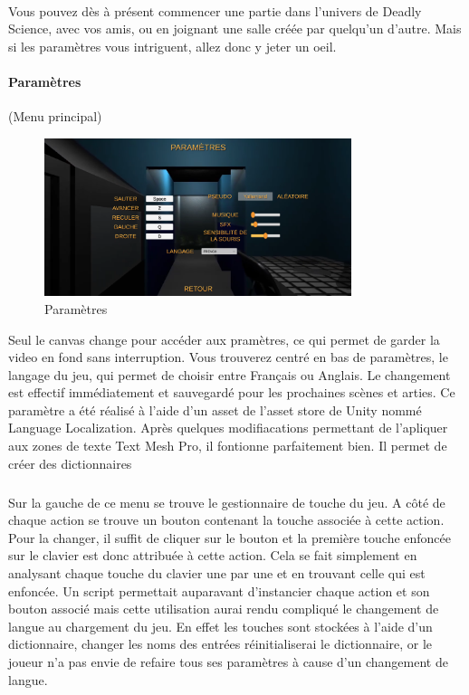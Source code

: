 \documentclass{article}
\begin{document}
\paragraph{}
Vous pouvez dès à présent commencer une partie dans l'univers de Deadly Science, avec vos amis, ou en joignant une salle créée par quelqu'un d'autre. Mais si les paramètres vous intriguent, allez donc y jeter un oeil.

\paragraph{Paramètres}
(Menu principal)

\begin{figure}[H]
	\centering
	\includegraphics[width=0.8\textwidth]{Parametres.png}
	\caption{Paramètres}
	\label{Paramètres}
\end{figure}

Seul le canvas change pour accéder aux pramètres, ce qui permet de garder la video en fond sans interruption.
Vous trouverez centré en bas de paramètres, le langage du jeu, qui permet de choisir entre Français ou Anglais. Le changement est effectif immédiatement et sauvegardé pour les prochaines scènes et arties. Ce paramètre a été réalisé à l'aide d'un asset de l'asset store de Unity nommé Language Localization. Après quelques modifiacations permettant de l'apliquer aux zones de texte Text Mesh Pro, il fontionne parfaitement bien. Il permet de créer des dictionnaires
\subparagraph{}
Sur la gauche de ce menu se trouve le gestionnaire de touche du jeu. A côté de chaque action se trouve un bouton contenant la touche associée à cette action. Pour la changer, il suffit de cliquer sur le bouton et la première touche enfoncée sur le clavier est donc attribuée à cette action. Cela se fait simplement en analysant chaque touche du clavier une par une et en trouvant celle qui est enfoncée. Un script permettait auparavant d'instancier chaque action et son bouton associé mais cette utilisation aurai rendu compliqué le changement de langue au chargement du jeu. En effet les touches sont stockées à l'aide d'un dictionnaire, changer les noms des entrées réinitialiserai le dictionnaire, or le joueur n'a pas envie de refaire tous ses paramètres à cause d'un changement de langue.
\end{document}
